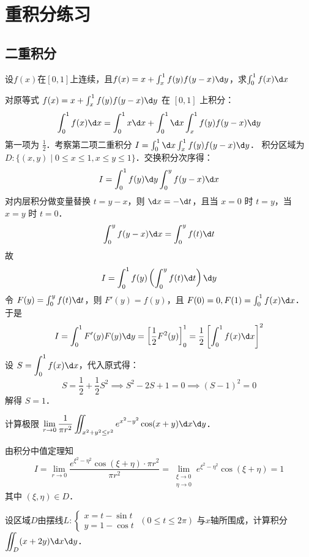 \documentclass[12pt, a4paper, oneside, UTF8]{ctexbook}
\begin{document}
\section{重积分练习}
\subsection{二重积分}
\begin{exercise}
    设$f(x)$在$[0,1]$上连续，且$f(x)=x+\int_x^1f(y)f(y-x)\d y$，求$\int_0^1f(x)\d x$
\end{exercise}
\begin{solution}
    对原等式 $f(x)=x+\int_x^1f(y)f(y-x)\d y$ 在 $[0,1]$ 上积分：
    \[ \int_0^1 f(x) \d x = \int_0^1 x \d x + \int_0^1 \d x \int_x^1 f(y)f(y-x) \d y \]
    第一项为 $\frac{1}{2}$．考察第二项二重积分 $I = \int_0^1 \d x \int_x^1 f(y)f(y-x) \d y$．
    积分区域为 $D: \{ (x,y) \mid 0 \le x \le 1, x \le y \le 1 \}$．交换积分次序得：
    \[ I = \int_0^1 f(y) \d y \int_0^y f(y-x) \d x \]
    对内层积分做变量替换 $t = y-x$，则 $\d x = -\d t$，且当 $x=0$ 时 $t=y$，当 $x=y$ 时 $t=0$．
    \[ \int_0^y f(y-x) \d x = \int_0^y f(t) \d t \]
    故
    \[ I = \int_0^1 f(y) \left( \int_0^y f(t) \d t \right) \d y \]
    令 $F(y) = \int_0^y f(t) \d t$，则 $F'(y) = f(y)$，且 $F(0) = 0, F(1) = \int_0^1 f(x) \d x$．
    于是
    \[ I = \int_0^1 F'(y) F(y) \d y = \left[ \frac{1}{2} F^2(y) \right]_0^1 = \frac{1}{2} \left[ \int_0^1 f(x) \d x \right]^2 \]
    设 $S = \displaystyle\int_0^1 f(x) \d x$，代入原式得：
    \[ S = \frac{1}{2} + \frac{1}{2} S^2 \implies S^2 - 2S + 1 = 0 \implies (S-1)^2 = 0 \]
    解得 $\boxed{S = 1}$．
\end{solution}
\begin{exercise}
    计算极限 $\displaystyle\lim_{r \to 0} \frac{1}{\pi r^2} \iint_{x^2+y^2 \le r^2} e^{x^2-y^2} \cos (x+y) \d x \d y$．
\end{exercise}
\begin{solution}
    由积分中值定理知
    \[I=\lim_{r\to 0}\frac{e^{\xi^2-\eta^2}\cos(\xi+\eta)\cdot\pi r^2}{\pi r^2}=\lim_{\substack{\xi\to 0\\\eta\to 0}} e^{\xi^2-\eta^2}\cos(\xi+\eta) = \boxed{1} \]
    其中 $(\xi, \eta)\in D$．
\end{solution}
\begin{exercise}
    设区域$D$由摆线$L:\begin{cases}
        x=t-\sin t\\
        y=1-\cos t
    \end{cases}\; (0\le t\le 2\pi)$ 与$x$轴所围成，计算积分$\displaystyle\iint_D(x+2y)\d x\d y$．
\end{exercise}
\end{document}
